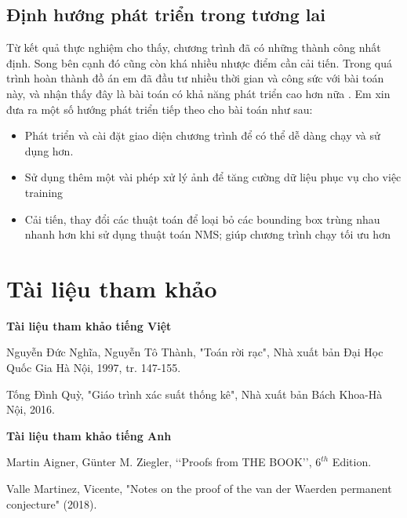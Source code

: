 \documentclass[a4paper, 12pt]{report}
\begin{document}
\section{Định hướng phát triển trong tương lai}
Từ kết quả thực nghiệm cho thấy, chương trình đã có những thành công nhất định. Song bên cạnh đó cũng còn khá nhiều nhược điểm cần cải tiến. Trong quá trình hoàn thành đồ án em đã đầu tư nhiều thời gian và công sức với bài toán này, và nhận thấy đây là bài toán có khả năng phát triển cao hơn nữa . Em xin đưa ra một số hướng phát triển tiếp theo cho bài toán như sau:
\begin{itemize}
	\item Phát triển và cài đặt giao diện chương trình để có thể dễ dàng chạy và sử dụng hơn. 
	\item Sử dụng thêm một vài phép xử lý ảnh để tăng cường dữ liệu phục vụ cho việc training 
	\item Cải tiến, thay đổi các thuật toán để loại bỏ các bounding box trùng nhau nhanh hơn khi sử dụng thuật toán NMS; giúp chương trình chạy tối ưu hơn
\end{itemize}





\chapter*{Tài liệu tham khảo}
\mdseries 
\textbf{Tài liệu tham khảo tiếng Việt}

\begin{enumerate}[label=\textrm{[\arabic*.]}]
\item Nguyễn Đức Nghĩa, Nguyễn Tô Thành, "Toán rời rạc", Nhà xuất bản Đại Học Quốc Gia Hà Nội, 1997, tr. 147-155.
\item Tống Đình Quỳ, "Giáo trình xác suất thống kê", Nhà xuất bản Bách Khoa-Hà Nội, 2016.
\end{enumerate}
 \textbf{Tài liệu tham khảo tiếng Anh}
\begin{enumerate}[label=\textrm{[\arabic*.]}]
\item
	Martin Aigner, Günter M. Ziegler, ‘‘Proofs from THE BOOK’’, $6^{th}$ Edition.
\item
	Valle Martinez, Vicente, "Notes on the proof of the van der Waerden permanent conjecture" (2018).
\end{enumerate}
\end{document}
